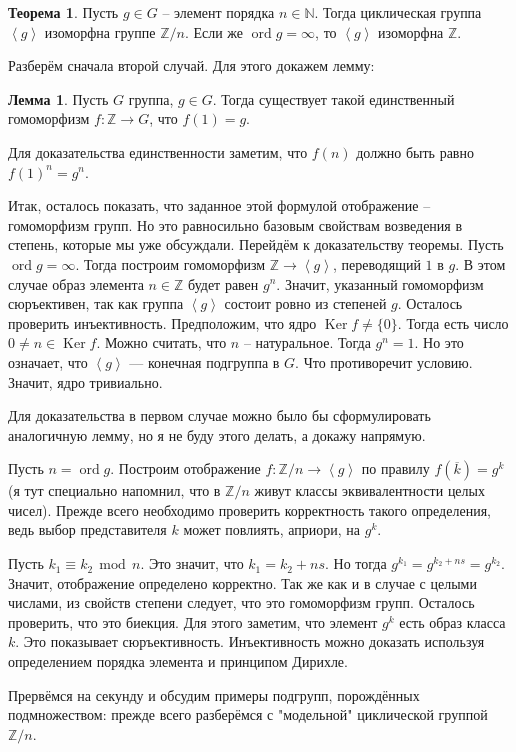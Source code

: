 \documentclass[10pt,a4paper,oneside]{book}
\theoremstyle{definition}
\newtheorem{thm}{\color{red!40!black}Теорема}
\newtheorem{lem}{\color{green!50!black}Лемма}
\renewcommand{\mod}{\,\operatorname{mod}\,}
\newcommand{\mb}[1]{\mathbb{#1}}
\newcommand{\ovl}{\overline}
\DeclareMathOperator{\Ker}{Ker}
\newcommand{\ord}{\operatorname{ord}}
\def\lan{\left\langle }
\def\ran{\right\rangle}
\def\thrm{\begin{thm}}
\def\ethrm{\end{thm}}
\def\lm{\begin{lem}}
\def\elm{\end{lem}}
\begin{document}
\thrm Пусть $g\in G$ -- элемент порядка $n\in \mb N$. Тогда циклическая группа $\lan g \ran $ изоморфна группе $\mb Z/n$. Если же $\ord g = \infty$, то $\lan g \ran$ изоморфна $\mb Z$.
\ethrm
{} Разберём сначала второй случай. Для этого докажем лемму: 
\lm Пусть $G$ группа, $g\in G$. Тогда существует такой единственный гомоморфизм $f \colon \mb Z \to G$, что $f(1)=g$.
\elm
\proof Для доказательства единственности заметим, что $f(n)$ должно быть равно $f(1)^n=g^n$. 

Итак, осталось показать, что заданное этой формулой отображение --  гомоморфизм групп. Но это равносильно базовым свойствам возведения в степень, которые мы уже обсуждали.
\endproof
{}
Перейдём к доказательству теоремы. Пусть $\ord g=\infty$. Тогда построим гомоморфизм $\mb Z \to \lan g \ran$, переводящий $1$ в $g$. В этом случае образ элемента $n \in \mb Z$ будет равен $g^n$. Значит, указанный гомоморфизм сюръективен, так как группа $\lan g \ran$ состоит ровно из степеней $g$. Осталось проверить инъективность. Предположим, что ядро $\Ker f \neq \{0\}$. Тогда есть число $0\neq n \in\Ker f $. Можно считать, что $n$ -- натуральное. Тогда $g^n=1$. Но это означает, что $\lan g \ran$ --- конечная подгруппа в $G$. Что противоречит условию. Значит, ядро тривиально.


Для доказательства в первом случае можно было бы сформулировать аналогичную лемму, но я не буду этого делать, а докажу напрямую.

Пусть $n=\ord g$. Построим отображение $f \colon\mb Z/n \to \lan g\ran $ по правилу $f(\ovl{k})=g^k$ (я тут специально напомнил, что в $\mb Z/n$ живут классы эквивалентности целых чисел).  Прежде всего необходимо проверить корректность такого определения, ведь выбор представителя $k$ может повлиять, априори, на $g^k$. 

Пусть $k_1\equiv k_2 \mod n$. Это значит, что $k_1=k_2+ns$. Но тогда $g^{k_1}=g^{k_2+ns}=g^{k_2}$. Значит, отображение определено корректно. Так же как и в случае с целыми числами, из свойств степени следует, что это гомоморфизм групп.   Осталось проверить, что это биекция. Для этого заметим, что элемент $g^k$ есть образ класса $k$. Это показывает сюръективность. Инъективность можно доказать используя определением порядка элемента и принципом Дирихле.
\endproof

Прервёмся на секунду и обсудим примеры подгрупп, порождённых подмножеством: прежде всего разберёмся с "модельной" циклической группой $\mb Z/n$.
\end{document}
